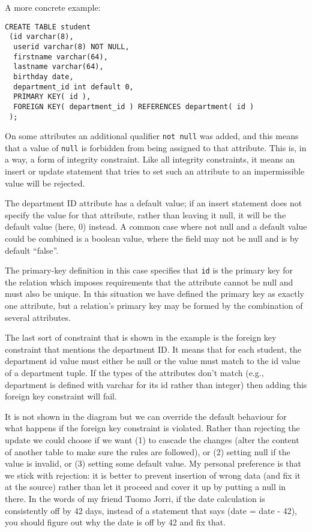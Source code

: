 \documentclass[a4paper]{report}
\begin{document}
A more concrete example: 
{\small
\begin{verbatim}
CREATE TABLE student
 (id varchar(8),
  userid varchar(8) NOT NULL,
  firstname varchar(64),
  lastname varchar(64),
  birthday date,
  department_id int default 0,
  PRIMARY KEY( id ),
  FOREIGN KEY( department_id ) REFERENCES department( id )
 );
\end{verbatim}
}


On some attributes an additional qualifier \texttt{not null} was added, and this means that a value of \texttt{null} is forbidden from being assigned to that attribute. This is, in a way, a form of integrity constraint. Like all integrity constraints, it means an insert or update statement that tries to set such an attribute to an impermissible value will be rejected. 

The department ID attribute has a default value; if an insert statement does not specify the value for that attribute, rather than leaving it null, it will be the default value (here, 0) instead. A common case where not null and a default value could be combined is a boolean value, where the field may not be null and is by default ``false''.

The primary-key definition in this case specifies that \texttt{id} is the primary key for the relation which imposes requirements that the attribute cannot be null and must also be unique. In this situation we have defined the primary key as exactly one attribute, but a relation's primary key may be formed by the combination of several attributes. 
 
The last sort of constraint that is shown in the example is the foreign key constraint that mentions the department ID. It means that for each student, the department id value must either be null or the value must match to the id value of a department tuple. If the types of the attributes don't match (e.g., department is defined with varchar for its id rather than integer) then adding this foreign key constraint will fail. 


It is not shown in the diagram but we can override the default behaviour for what happens if the foreign key constraint is violated. Rather than rejecting the update we could choose if we want (1) to cascade the changes (alter the content of another table to make sure the rules are followed), or (2) setting null if the value is invalid, or (3) setting some default value. My personal preference is that we stick with rejection: it is better to prevent insertion of wrong data (and fix it at the source) rather than let it proceed and cover it up by putting a null in there. In the words of my friend Tuomo Jorri, if the date calculation is consistently off by 42 days, instead of a statement that says (date = date - 42), you should figure out why the date is off by 42 and fix that.
\end{document}
